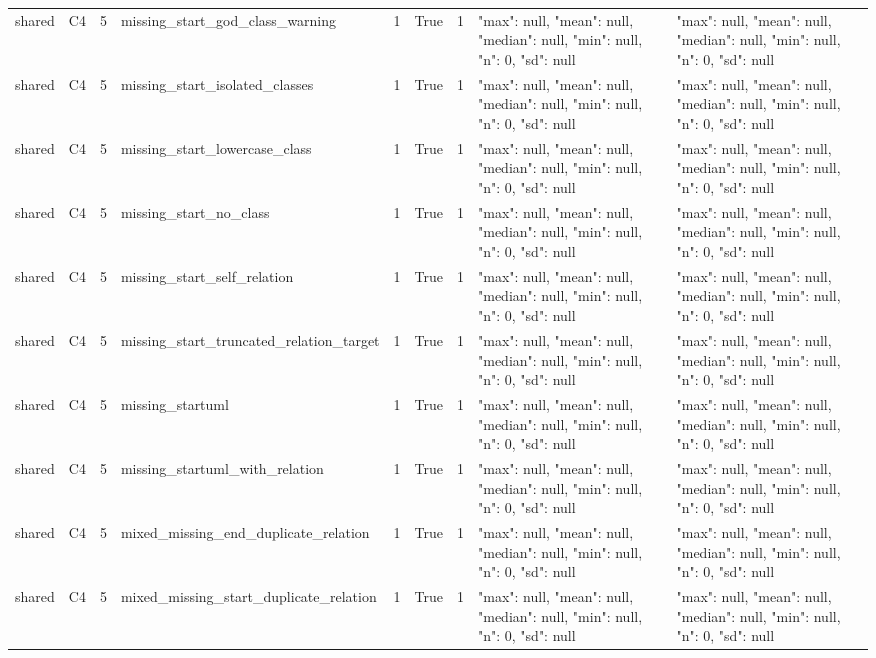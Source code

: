 \begin{tabular}{lllllllll}
shared & C4 & 5 & missing\_start\_god\_class\_warning & 1 & True & 1 & {"max": null, "mean": null, "median": null, "min": null, "n": 0, "sd": null} & {"max": null, "mean": null, "median": null, "min": null, "n": 0, "sd": null} \\
shared & C4 & 5 & missing\_start\_isolated\_classes & 1 & True & 1 & {"max": null, "mean": null, "median": null, "min": null, "n": 0, "sd": null} & {"max": null, "mean": null, "median": null, "min": null, "n": 0, "sd": null} \\
shared & C4 & 5 & missing\_start\_lowercase\_class & 1 & True & 1 & {"max": null, "mean": null, "median": null, "min": null, "n": 0, "sd": null} & {"max": null, "mean": null, "median": null, "min": null, "n": 0, "sd": null} \\
shared & C4 & 5 & missing\_start\_no\_class & 1 & True & 1 & {"max": null, "mean": null, "median": null, "min": null, "n": 0, "sd": null} & {"max": null, "mean": null, "median": null, "min": null, "n": 0, "sd": null} \\
shared & C4 & 5 & missing\_start\_self\_relation & 1 & True & 1 & {"max": null, "mean": null, "median": null, "min": null, "n": 0, "sd": null} & {"max": null, "mean": null, "median": null, "min": null, "n": 0, "sd": null} \\
shared & C4 & 5 & missing\_start\_truncated\_relation\_target & 1 & True & 1 & {"max": null, "mean": null, "median": null, "min": null, "n": 0, "sd": null} & {"max": null, "mean": null, "median": null, "min": null, "n": 0, "sd": null} \\
shared & C4 & 5 & missing\_startuml & 1 & True & 1 & {"max": null, "mean": null, "median": null, "min": null, "n": 0, "sd": null} & {"max": null, "mean": null, "median": null, "min": null, "n": 0, "sd": null} \\
shared & C4 & 5 & missing\_startuml\_with\_relation & 1 & True & 1 & {"max": null, "mean": null, "median": null, "min": null, "n": 0, "sd": null} & {"max": null, "mean": null, "median": null, "min": null, "n": 0, "sd": null} \\
shared & C4 & 5 & mixed\_missing\_end\_duplicate\_relation & 1 & True & 1 & {"max": null, "mean": null, "median": null, "min": null, "n": 0, "sd": null} & {"max": null, "mean": null, "median": null, "min": null, "n": 0, "sd": null} \\
shared & C4 & 5 & mixed\_missing\_start\_duplicate\_relation & 1 & True & 1 & {"max": null, "mean": null, "median": null, "min": null, "n": 0, "sd": null} & {"max": null, "mean": null, "median": null, "min": null, "n": 0, "sd": null} \\

\end{tabular}
